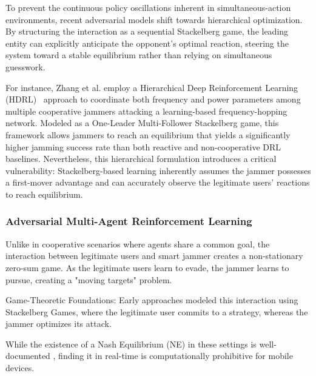 \documentclass[conference]{IEEEtran}
\newcommand{\adm}[1]{{\color{orange}{[#1]}}}
\begin{document}
To prevent the continuous policy oscillations inherent in simultaneous-action environments, recent adversarial models shift towards hierarchical optimization. 
By structuring the interaction as a sequential Stackelberg game, the leading entity can explicitly anticipate the opponent's optimal reaction, steering the system toward a stable equilibrium rather than relying on simultaneous guesswork.

For instance, Zhang et al. employ a Hierarchical Deep Reinforcement Learning (HDRL)~\cite{article} approach to coordinate both frequency and power parameters among multiple cooperative jammers attacking a learning-based frequency-hopping network.
Modeled as a One-Leader Multi-Follower Stackelberg game, this framework allows jammers 
to reach an equilibrium that yields a significantly higher jamming success rate than both reactive and non-cooperative DRL baselines.
Nevertheless, this hierarchical formulation introduces a critical vulnerability: Stackelberg-based learning inherently assumes the jammer possesses a first-mover advantage and can accurately observe the legitimate users' reactions to reach equilibrium.

\subsubsection{Adversarial Multi-Agent Reinforcement Learning}
Unlike in cooperative scenarios where agents share a common goal, the interaction between legitimate users and smart jammer creates a non-stationary zero-sum game. 
As the legitimate users learn to evade, the jammer learns to pursue, creating a "moving targets" problem.

Game-Theoretic Foundations:
Early approaches modeled this interaction using Stackelberg Games, where the legitimate user commits to a strategy, whereas the jammer optimizes its attack. 

While the existence of a Nash Equilibrium (NE) in these settings is well-documented \cite{xu2020convert}
, finding it in real-time is computationally prohibitive for mobile devices. 
\end{document}
